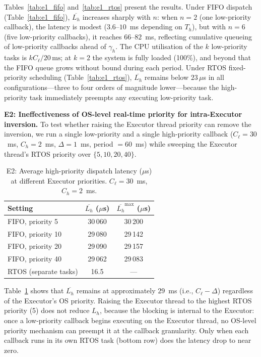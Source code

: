 Tables~\ref{tab:e1_fifo} and~\ref{tab:e1_rtos} present the results. Under FIFO dispatch (Table~\ref{tab:e1_fifo}), $\overline{L_h}$ increases sharply with $n$: when $n=2$ (one low-priority callback), the latency is modest ($3.6$--$10$~ms depending on $T_h$), but with $n=6$ (five low-priority callbacks), it reaches $66$--$82$~ms, reflecting cumulative queueing of low-priority callbacks ahead of $\gamma_h$. The CPU utilisation of the $k$ low-priority tasks is $k C_\ell / 20\,\text{ms}$; at $k=2$ the system is fully loaded (100\%), and beyond that the FIFO queue grows without bound during each period. Under RTOS fixed-priority scheduling (Table~\ref{tab:e1_rtos}), $\overline{L_h}$ remains below $23\,\mu$s in all configurations---three to four orders of magnitude lower---because the high-priority task immediately preempts any executing low-priority task.

\textbf{E2: Ineffectiveness of OS-level real-time priority for intra-Executor inversion.}
To test whether raising the Executor thread priority can remove the inversion, we run a single low-priority and a single high-priority callback ($C_\ell = 30$~ms, $C_h = 2$~ms, $\Delta = 1$~ms, period $= 60$~ms) while sweeping the Executor thread's RTOS priority over $\{5, 10, 20, 40\}$.

\begin{table}[t]
\centering
\caption{E2: Average high-priority dispatch latency ($\mu$s) at different Executor priorities. $C_\ell = 30$~ms, $C_h = 2$~ms.}
\label{tab:e2}
\begin{tabular}{lcc}
\hline
\textbf{Setting} & $\overline{L_h}$ ($\mu$s) & $\overline{L_h}^{\max}$ ($\mu$s) \\
\hline
FIFO, priority 5  & 30\,060 & 30\,200 \\
FIFO, priority 10 & 29\,080 & 29\,142 \\
FIFO, priority 20 & 29\,090 & 29\,157 \\
FIFO, priority 40 & 29\,062 & 29\,083 \\
RTOS (separate tasks) & 16.5 & --- \\
\hline
\end{tabular}
\end{table}

Table~\ref{tab:e2} shows that $\overline{L_h}$ remains at approximately $29$~ms (i.e., $C_\ell - \Delta$) regardless of the Executor's OS priority. Raising the Executor thread to the highest RTOS priority (5) does not reduce $L_h$, because the blocking is internal to the Executor: once a low-priority callback begins executing on the Executor thread, no OS-level priority mechanism can preempt it at the callback granularity. Only when each callback runs in its own RTOS task (bottom row) does the latency drop to near zero.

